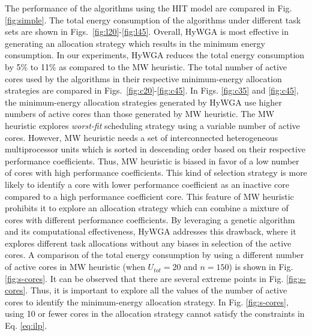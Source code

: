 \documentclass[conference]{IEEEtran}
\begin{document}
The performance of the algorithms using the HIT model are compared in Fig. \ref{fig:simple}.
The total energy consumption of the algorithms under different task sets are shown in Figs.~\ref{fig:l20}-\ref{fig:l45}.
Overall, HyWGA is most effective in generating an allocation strategy which results in the minimum energy consumption.
In our experiments, HyWGA reduces the total energy consumption by 5\% to 11\% as compared to the MW heuristic.
The total number of active cores used by the algorithms in their respective minimum-energy allocation strategies
are compared in Figs.~\ref{fig:c20}-\ref{fig:c45}.
In Figs. \ref{fig:c35} and \ref{fig:c45}, the minimum-energy allocation strategies
generated by HyWGA use higher numbers of active cores than those generated by MW heuristic.
The MW heuristic explores \emph{worst-fit} scheduling strategy using a variable number of active cores. However, MW heuristic needs  a set
of interconnected heterogeneous multiprocessor units which is sorted in descending order based on their respective performance coefficients.
Thus, MW heuristic is biased in favor of a low number of cores with high performance coefficients. This kind of selection strategy is more likely to identify
a core with lower performance coefficient as an inactive core compared to a high performance coefficient core.
This feature of MW heuristic prohibits it to explore an allocation strategy which can combine a mixture of cores with different
performance coefficients.
By leveraging a genetic algorithm and its computational effectiveness, HyWGA addresses this drawback, where it explores different task allocations without any biases in selection of the active cores.
A comparison of the total energy consumption by using a different number of active cores in MW heuristic (when $U_{tot}=20$ and $n=150$)
is shown in Fig. \ref{fig:s-cores}. It can be observed that there are several extreme points in Fig. \ref{fig:s-cores}.
Thus, it is important to explore all the values of the number of active cores to identify the minimum-energy allocation strategy. In Fig. \ref{fig:s-cores},
using 10 or fewer cores in the allocation strategy cannot satisfy the constraints in Eq. \ref{eq:ilp}.
\end{document}
